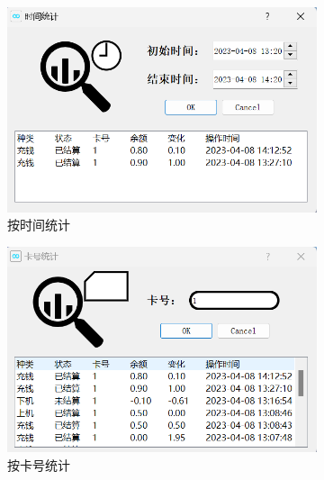 \documentclass{article}
\begin{document}
    \begin{figure}[htbp]
        \centering
        \begin{subfigure}{0.3\linewidth}
            \centering
            \includegraphics[scale=0.4]{figure/count_time.png}
            \caption{按时间统计}
            \label{count_time}
        \end{subfigure}
        \centering
        \begin{subfigure}{0.3\linewidth}
            \centering
            \includegraphics[scale=0.4]{figure/count_card.png}
            \caption{按卡号统计}
            \label{count_card}
        \end{subfigure}
        \centering
        \begin{subfigure}{0.3\linewidth}
            \centering

\end{subfigure}
\end{figure}
\end{document}
